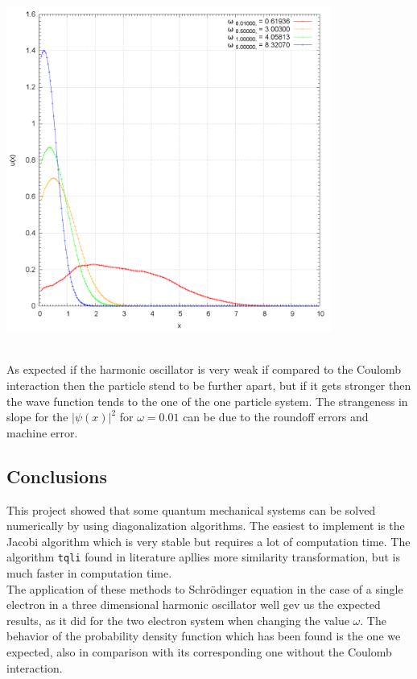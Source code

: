 \documentclass[10pt,a4paper,titlepage]{article}
\begin{document}
\begin{minipage}{0.5\textwidth}
	\includegraphics[width=0.8\textwidth]{plot_omega.png}
\end{minipage}\\
As expected if the harmonic oscillator is very weak if compared to the Coulomb interaction then the particle stend to be further apart, but if it gets 
stronger then the wave function tends to the one of the one particle system. The strangeness in slope for the $|\psi(x)|^2$ for $\omega = 0.01$ can be
due to the roundoff errors and machine error.

\subsection*{Conclusions}
This project showed that some quantum mechanical systems can be solved numerically by using diagonalization algorithms. The easiest to implement is the 
Jacobi algorithm which is very stable but requires a lot of computation time. The algorithm \texttt{tqli} found in literature apllies more similarity
transformation, but is much faster in computation time. \\
The application of these methods to Schr\"odinger equation in the case of a single electron in a three dimensional harmonic oscillator well
gev us the expected results, as it did for the two electron system when changing the value $\omega$. The behavior of the probability
density function which has been found is the one we expected, also in comparison with its corresponding one without the Coulomb interaction. 
\end{document}

